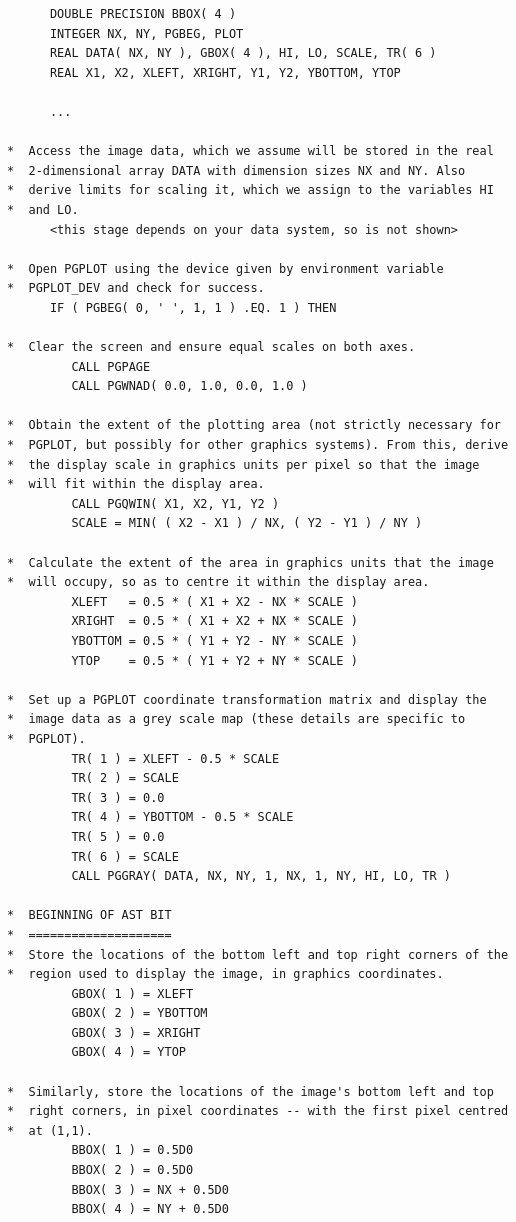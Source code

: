 \documentclass[twoside,11pt]{article}
\begin{document}
\begin{verbatim}
      DOUBLE PRECISION BBOX( 4 )
      INTEGER NX, NY, PGBEG, PLOT
      REAL DATA( NX, NY ), GBOX( 4 ), HI, LO, SCALE, TR( 6 )
      REAL X1, X2, XLEFT, XRIGHT, Y1, Y2, YBOTTOM, YTOP

      ...

*  Access the image data, which we assume will be stored in the real
*  2-dimensional array DATA with dimension sizes NX and NY. Also
*  derive limits for scaling it, which we assign to the variables HI
*  and LO.
      <this stage depends on your data system, so is not shown>

*  Open PGPLOT using the device given by environment variable
*  PGPLOT_DEV and check for success.
      IF ( PGBEG( 0, ' ', 1, 1 ) .EQ. 1 ) THEN

*  Clear the screen and ensure equal scales on both axes.
         CALL PGPAGE
         CALL PGWNAD( 0.0, 1.0, 0.0, 1.0 )

*  Obtain the extent of the plotting area (not strictly necessary for
*  PGPLOT, but possibly for other graphics systems). From this, derive
*  the display scale in graphics units per pixel so that the image
*  will fit within the display area.
         CALL PGQWIN( X1, X2, Y1, Y2 )
         SCALE = MIN( ( X2 - X1 ) / NX, ( Y2 - Y1 ) / NY )

*  Calculate the extent of the area in graphics units that the image
*  will occupy, so as to centre it within the display area.
         XLEFT   = 0.5 * ( X1 + X2 - NX * SCALE )
         XRIGHT  = 0.5 * ( X1 + X2 + NX * SCALE )
         YBOTTOM = 0.5 * ( Y1 + Y2 - NY * SCALE )
         YTOP    = 0.5 * ( Y1 + Y2 + NY * SCALE )
 
*  Set up a PGPLOT coordinate transformation matrix and display the
*  image data as a grey scale map (these details are specific to
*  PGPLOT).
         TR( 1 ) = XLEFT - 0.5 * SCALE
         TR( 2 ) = SCALE
         TR( 3 ) = 0.0
         TR( 4 ) = YBOTTOM - 0.5 * SCALE
         TR( 5 ) = 0.0
         TR( 6 ) = SCALE
         CALL PGGRAY( DATA, NX, NY, 1, NX, 1, NY, HI, LO, TR )

*  BEGINNING OF AST BIT
*  ====================
*  Store the locations of the bottom left and top right corners of the
*  region used to display the image, in graphics coordinates.
         GBOX( 1 ) = XLEFT
         GBOX( 2 ) = YBOTTOM
         GBOX( 3 ) = XRIGHT
         GBOX( 4 ) = YTOP

*  Similarly, store the locations of the image's bottom left and top
*  right corners, in pixel coordinates -- with the first pixel centred
*  at (1,1).
         BBOX( 1 ) = 0.5D0
         BBOX( 2 ) = 0.5D0
         BBOX( 3 ) = NX + 0.5D0
         BBOX( 4 ) = NY + 0.5D0


\end{verbatim}
\end{document}
